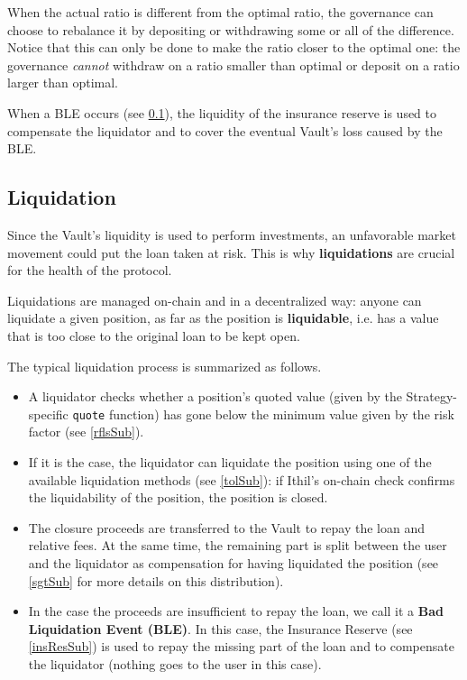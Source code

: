 \documentclass[a4paper,10 pt]{article}
\theoremstyle{definition}
\begin{document}
When the actual ratio is different from the optimal ratio, the governance can choose to rebalance it by depositing or withdrawing some or all of the difference. Notice that this can only be done to make the ratio closer to the optimal one: the governance {\it cannot} withdraw on a ratio smaller than optimal or deposit on a ratio larger than optimal.

When a BLE occurs (see \ref{liqSub0}), the liquidity of the insurance reserve is used to compensate the liquidator and to cover the eventual Vault's loss caused by the BLE.

\subsection{Liquidation}\label{liqSub0}
Since the Vault's liquidity is used to perform investments, an unfavorable market movement could put the loan taken at risk. This is why {\bf liquidations} are crucial for the health of the protocol.

Liquidations are managed on-chain and in a decentralized way: anyone can liquidate a given position, as far as the position is {\bf liquidable}, i.e. has a value that is too close to the original loan to be kept open.

The typical liquidation process is summarized as follows.
\begin{itemize}
\item A liquidator checks whether a position's quoted value (given by the Strategy-specific \verb|quote| function) has gone below the minimum value given by the risk factor (see \ref{rflsSub}).
\item If it is the case, the liquidator can liquidate the position using one of the available liquidation methods (see \ref{tolSub}): if Ithil's on-chain check confirms the liquidability of the position, the position is closed.
\item The closure proceeds are transferred to the Vault to repay the loan and relative fees. At the same time, the remaining part is split between the user and the liquidator as compensation for having liquidated the position (see \ref{sgtSub} for more details on this distribution).
\item In the case the proceeds are insufficient to repay the loan, we call it a {\bf Bad Liquidation Event (BLE)}. In this case, the Insurance Reserve (see \ref{insResSub}) is used to repay the missing part of the loan and to compensate the liquidator (nothing goes to the user in this case).
\end{itemize}
\end{document}
